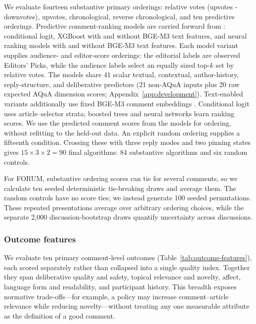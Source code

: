 We evaluate fourteen substantive primary orderings: relative votes (upvotes - downvotes), upvotes, chronological, reverse chronological, and ten predictive orderings. Predictive comment-ranking models are carried forward from \citep{CommentGap1}: conditional logit, XGBoost with and without BGE-M3 text features, and neural ranking models with and without BGE-M3 text features. Each model variant supplies audience- and editor-score orderings: the editorial labels are observed Editors' Picks, while the audience labels select an equally sized top-$k$ set by relative votes. The models share 41 scalar textual, contextual, author-history, reply-structure, and deliberative predictors (21 non-AQuA inputs plus 20 raw expected AQuA dimension scores; Appendix~\ref{app:development}). Text-enabled variants additionally use fixed BGE-M3 comment embeddings \citep{chen2024m3}. Conditional logit uses article--selector strata; boosted trees and neural networks learn ranking scores. We use the predicted comment scores from the models for ordering, without refitting to the held-out data. An explicit random ordering supplies a fifteenth condition. Crossing these with three reply modes and two pinning states gives $15\times3\times2=90$ final algorithms: 84 substantive algorithms and six random controls.

For FORUM, substantive ordering scores can tie for several comments, so we calculate ten seeded deterministic tie-breaking draws and average them. The random controls have no score ties; we instead generate 100 seeded permutations. These repeated presentations average over arbitrary ordering choices, while the separate 2,000 discussion-bootstrap draws quantify uncertainty across discussions.

\subsubsection{Outcome features}
We evaluate ten primary comment-level outcomes (Table~\ref{tab:outcome-features}), each scored separately rather than collapsed into a single quality index. Together they span deliberative quality and safety, topical relevance and novelty, affect, language form and readability, and participant history. This breadth exposes normative trade-offs---for example, a policy may increase comment--article relevance while reducing novelty---without treating any one measurable attribute as the definition of a good comment.

